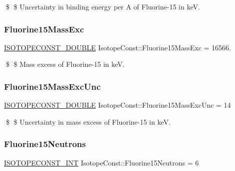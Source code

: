 \$ \$ Uncertainty in binding energy per A of Fluorine-\/15 in keV. \mbox{\label{group___isotope_const-_fluorine-_f15_ga86003a0af4ef835ee9bc06aab9007b99}} 
\subsubsection{\texorpdfstring{Fluorine15\+Mass\+Exc}{Fluorine15MassExc}}
{\footnotesize\ttfamily \mbox{\hyperlink{group___isotope_const-_macros_ga8f45a7272ce02c0b4c65c44636ed719a}{I\+S\+O\+T\+O\+P\+E\+C\+O\+N\+S\+T\+\_\+\+D\+O\+U\+B\+LE}} Isotope\+Const\+::\+Fluorine15\+Mass\+Exc = 16566.}

\$ \$ Mass excess of Fluorine-\/15 in keV. \mbox{\label{group___isotope_const-_fluorine-_f15_ga33962ca1c923802bd948c8e9f84c04bb}} 
\subsubsection{\texorpdfstring{Fluorine15\+Mass\+Exc\+Unc}{Fluorine15MassExcUnc}}
{\footnotesize\ttfamily \mbox{\hyperlink{group___isotope_const-_macros_ga8f45a7272ce02c0b4c65c44636ed719a}{I\+S\+O\+T\+O\+P\+E\+C\+O\+N\+S\+T\+\_\+\+D\+O\+U\+B\+LE}} Isotope\+Const\+::\+Fluorine15\+Mass\+Exc\+Unc = 14}

\$ \$ Uncertainty in mass excess of Fluorine-\/15 in keV. \mbox{\label{group___isotope_const-_fluorine-_f15_ga13cb633bab3d79012dcfe0de37879903}} 
\subsubsection{\texorpdfstring{Fluorine15\+Neutrons}{Fluorine15Neutrons}}
{\footnotesize\ttfamily \mbox{\hyperlink{group___isotope_const-_macros_ga5f18360b3e99483a35c32d789e62621c}{I\+S\+O\+T\+O\+P\+E\+C\+O\+N\+S\+T\+\_\+\+I\+NT}} Isotope\+Const\+::\+Fluorine15\+Neutrons = 6}

